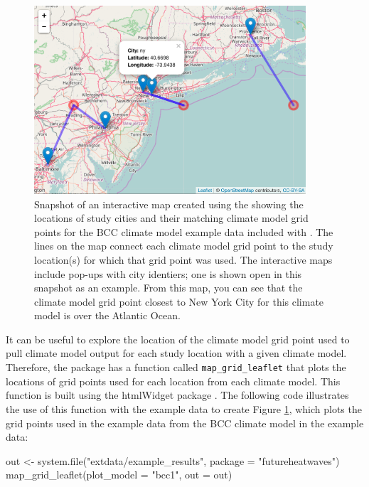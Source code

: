 \begin{figure}
\begin{center}
\includegraphics[width = 0.9\textwidth]{ExampleLeaflet}
\end{center}
\caption{Snapshot of an interactive map created using the  showing the locations of study cities and their matching climate model grid points for the BCC climate model example data included with . The lines on the map connect each climate model grid point to the study location(s) for which that grid point was used. The interactive maps include pop-ups with city identiers; one is shown open in this snapshot as an example. From this map, you can see that the climate model grid point closest to New York City for this climate model is over the Atlantic Ocean.}
\label{fig:gridmap}
\end{figure}

It can be useful to explore the location of the climate model grid point
used to pull climate model output for each study location with a given
climate model. Therefore, the package has a function called
\texttt{map\_grid\_leaflet} that plots the locations of grid points used
for each location from each climate model. This function is built using
the htmlWidget  package \citep{leaflet}. The following code
illustrates the use of this function with the example data to create
Figure \ref{fig:gridmap}, which plots the grid points used in the
example data from the BCC climate model in the example data:

\begin{Schunk}
\begin{Sinput}
out <- system.file("extdata/example_results", package = "futureheatwaves")
map_grid_leaflet(plot_model = "bcc1", out = out)
\end{Sinput}
\end{Schunk}

